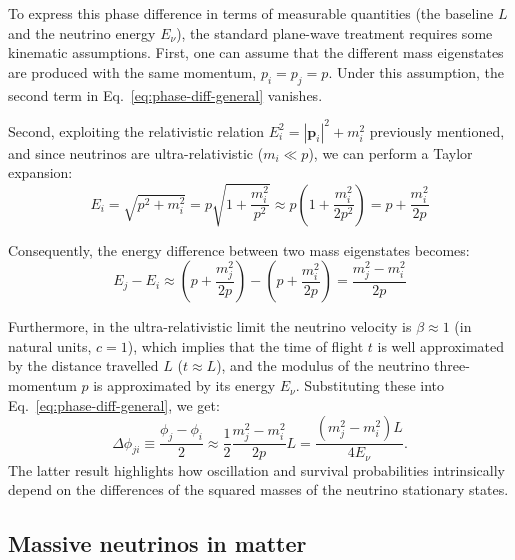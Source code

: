 To express this phase difference in terms of measurable quantities (the baseline $L$ and the neutrino energy $E_\nu$), the standard plane-wave treatment requires some kinematic assumptions. First, one can assume that the different mass eigenstates are produced with the same momentum, $p_i = p_j = p$. Under this assumption, the second term in Eq.~\ref{eq:phase-diff-general} vanishes.

Second, exploiting the relativistic relation $E_i^2 = |\mathbf{p}_i|^2 + m_i^2$ previously mentioned, and since neutrinos are ultra-relativistic 
($m_i \ll p$), we can perform a Taylor expansion:
\begin{equation}
    \label{eq:energy-taylor}
    E_i = \sqrt{p^2 + m_i^2} = p\sqrt{1 + \frac{m_i^2}{p^2}} \approx p \left( 1 + \frac{m_i^2}{2p^2} \right) = p + \frac{m_i^2}{2p}
\end{equation}

Consequently, the energy difference between two mass eigenstates becomes:
\begin{equation}
    \label{eq:energy-diff}
    E_j - E_i \approx \left( p + \frac{m_j^2}{2p} \right) - \left( p + \frac{m_i^2}{2p} \right) = \frac{m_j^2 - m_i^2}{2p}
\end{equation}

Furthermore, in the ultra-relativistic limit the neutrino velocity is $\beta \approx 1$ (in natural units, $c=1$), 
which implies that the time of flight $t$ is well approximated by the distance travelled $L$ ($t \approx L$), 
and the modulus of the neutrino three-momentum $p$ is approximated by its energy $E_\nu$. 
Substituting these into Eq.~\ref{eq:phase-diff-general}, we get:
\begin{equation}
    \label{eq:phase-diff-approx1}
    \Delta\phi_{ji} \equiv \frac{\phi_j - \phi_i}{2} \approx \frac{1}{2}\frac{m_j^2 - m_i^2}{2p}L = \frac{(m_j^2 - m_i^2)L}{4E_\nu}.
\end{equation}
The latter result highlights how oscillation and survival probabilities intrinsically depend on the differences of the squared masses of the neutrino stationary states.


\subsection{Massive neutrinos in matter}
\label{subsec:nu-in-matter}

